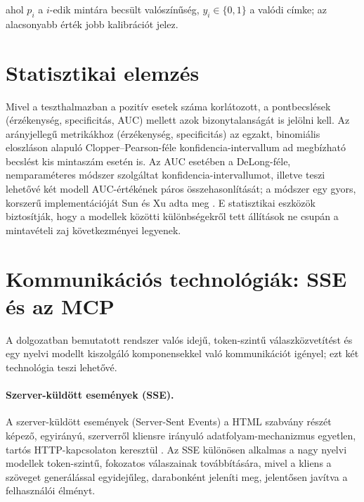 ahol $p_i$ a $i$-edik mintára becsült valószínűség, $y_i \in \{0,1\}$ a valódi
címke; az alacsonyabb érték jobb kalibrációt jelez.

\section{Statisztikai elemzés}

Mivel a teszthalmazban a pozitív esetek száma korlátozott, a pontbecslések
(érzékenység, specificitás, AUC) mellett azok bizonytalanságát is jelölni kell.
Az arányjellegű metrikákhoz (érzékenység, specificitás) az egzakt, binomiális
eloszláson alapuló Clopper--Pearson-féle konfidencia-intervallum ad megbízható
becslést kis mintaszám esetén is. Az AUC esetében a DeLong-féle, nemparaméteres
módszer szolgáltat konfidencia-intervallumot, illetve teszi lehetővé két modell
AUC-értékének páros összehasonlítását; a módszer egy gyors, korszerű
implementációját Sun és Xu adta meg \cite{sun2014delong}. E statisztikai eszközök
biztosítják, hogy a modellek közötti különbségekről tett állítások ne csupán a
mintavételi zaj következményei legyenek.

\section{Kommunikációs technológiák: SSE és az MCP}

A dolgozatban bemutatott rendszer valós idejű, token-szintű válaszközvetítést és
egy nyelvi modellt kiszolgáló komponensekkel való kommunikációt igényel; ezt két
technológia teszi lehetővé.

\paragraph{Szerver-küldött események (SSE).} A szerver-küldött események
(Server-Sent Events) a HTML szabvány részét képező, egyirányú, szerverről
kliensre irányuló adatfolyam-mechanizmus egyetlen, tartós HTTP-kapcsolaton
keresztül \cite{whatwg_sse}. Az SSE különösen alkalmas a nagy nyelvi modellek
token-szintű, fokozatos válaszainak továbbítására, mivel a kliens a szöveget
generálással egyidejűleg, darabonként jeleníti meg, jelentősen javítva a
felhasználói élményt.


